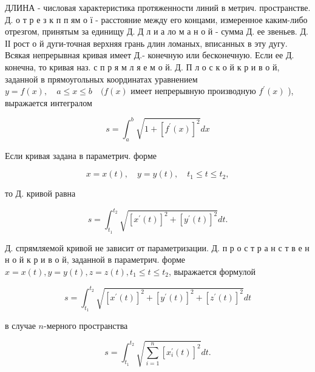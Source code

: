 \documentclass[10pt]{article}
\begin{document}
ДЛИНА - числовая характеристика протяженности линий в метрич. пространстве. Д. о т р е з к п п ям о ї - расстояние между его концами, измеренное каким-либо отрезгом, принятым за единищу Д. Д л и а ло м а н о й - сумма Д. ее звеньев. Д. ІІ рост о й дуги-точная верхняя грань длин ломаных, вписанных в эту дугу. Всякая непрерывная кривая имеет Д.- конечную или бесконечную. Если ее Д. конечна, то кривая наз. с п р я м л я е м о й. Д. П л о с к о й к р и в о й, заданной в прямоугольных координатах уравнением $y=f(x), \quad a \leqslant x \leqslant b \quad(f(x)$ имеет непрерывную производную $f^{\prime}(x)$ ), выражается интегралом



\[

s=\int_{a}^{b} \sqrt{1+\left[f^{\prime}(x)\right]^{2}} d x

\]



Если кривая задана в параметрич. форме



\[

x=x(t), \quad y=y(t), \quad t_{1} \leqslant t \leqslant t_{2},

\]



то Д. кривой равна



\[

s=\int_{t_{1}}^{t_{2}} \sqrt{\left[x^{\prime}(t)\right]^{2}+\left[y^{\prime}(t)\right]^{2}} d t .

\]



Д. спрямляемой кривой не зависит от параметризации. Д. п р о с т р а н с т в е н н о й к р и в о й, заданной в параметрич. форме $x=x(t), y=y(t), z=z(t), t_{1} \leqslant t \leqslant t_{2}$, выражается формулой



\[

s=\int_{t_{1}}^{t_{2}} \sqrt{\left[x^{\prime}(t)\right]^{2}+\left[y^{\prime}(t)\right]^{2}+\left[z^{\prime}(t)\right]^{2}} d t

\]



в случае $n$-мерного пространства



\[

s=\int_{t_{1}}^{t_{2}} \sqrt{\sum_{i=1}^{n}\left[x_{i}^{\prime}(t)\right]^{2}} d t .

\]
\end{document}

